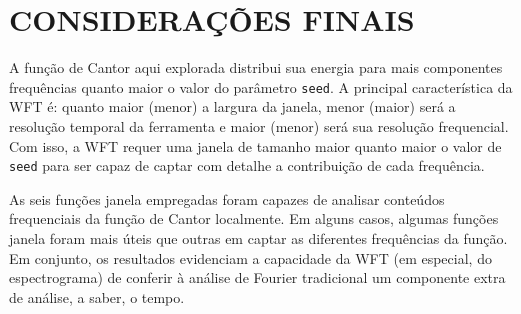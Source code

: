 \chapter{CONSIDERAÇÕES FINAIS}

A função de Cantor aqui explorada distribui sua energia para mais componentes frequências quanto maior o valor do parâmetro \texttt{seed}. A principal característica da WFT é: quanto maior (menor) a largura da janela, menor (maior) será a resolução temporal da ferramenta e maior (menor) será sua resolução frequencial. Com isso, a WFT requer uma janela de tamanho maior quanto maior o valor de \texttt{seed} para ser capaz de captar com detalhe a contribuição de cada frequência. 

As seis funções janela empregadas foram capazes de analisar conteúdos frequenciais da função de Cantor localmente. Em alguns casos, algumas funções janela foram mais úteis que outras em captar as diferentes frequências da função. Em conjunto, os resultados evidenciam a capacidade da WFT (em especial, do espectrograma) de conferir à análise de Fourier tradicional um componente extra de análise, a saber, o tempo.
 

